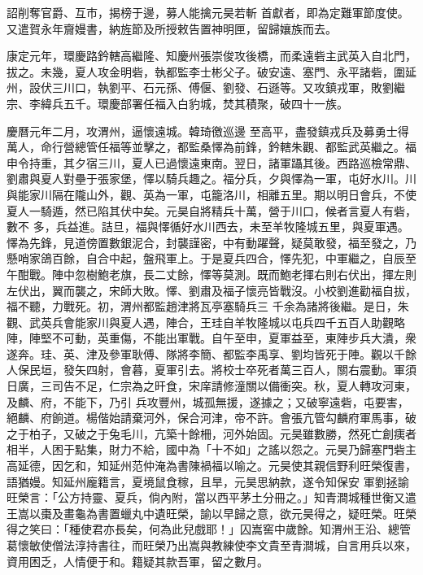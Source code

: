 \begin{pinyinscope}
 詔削奪官爵、互市，揭榜于邊，募人能擒元昊若斬
 首獻者，即為定難軍節度使。又遣賀永年齎嫚書，納旌節及所授敕告置神明匣，留歸孃族而去。



 康定元年，環慶路鈐轄高繼隆、知慶州張崇俊攻後橋，而柔遠砦主武英入自北門，拔之。未幾，夏人攻金明砦，執都監李士彬父子。破安遠、塞門、永平諸砦，圍延州，設伏三川口，執劉平、石元孫、傅偃、劉發、石遜等。又攻鎮戎軍，敗劉繼宗、李緯兵五千。環慶部署任福入白豹城，焚其積聚，破四十一族。



 慶曆元年二月，攻渭州，逼懷遠城。韓琦徼巡邊
 至高平，盡發鎮戎兵及募勇士得萬人，命行營總管任福等並擊之，都監桑懌為前鋒，鈐轄朱觀、都監武英繼之。福申令持重，其夕宿三川，夏人已過懷遠東南。翌日，諸軍躡其後。西路巡檢常鼎、劉肅與夏人對壘于張家堡，懌以騎兵趣之。福分兵，夕與懌為一軍，屯好水川。川與能家川隔在隴山外，觀、英為一軍，屯籠洛川，相離五里。期以明日會兵，不使夏人一騎遁，然已陷其伏中矣。元昊自將精兵十萬，營于川口，候者言夏人有砦，數不
 多，兵益進。詰旦，福與懌循好水川西去，未至羊牧隆城五里，與夏軍遇。懌為先鋒，見道傍置數銀泥合，封襲謹密，中有動躍聲，疑莫敢發，福至發之，乃懸哨家鴿百餘，自合中起，盤飛軍上。于是夏兵四合，懌先犯，中軍繼之，自辰至午酣戰。陣中忽樹鮑老旗，長二丈餘，懌等莫測。既而鮑老揮右則右伏出，揮左則左伏出，翼而襲之，宋師大敗。懌、劉肅及福子懷亮皆戰沒。小校劉進勸福自拔，福不聽，力戰死。初，渭州都監趙津將瓦亭塞騎兵三
 千余為諸將後繼。是日，朱觀、武英兵會能家川與夏人遇，陣合，王珪自羊牧隆城以屯兵四千五百人助觀略陣，陣堅不可動，英重傷，不能出軍戰。自午至申，夏軍益至，東陣步兵大潰，衆遂奔。珪、英、津及參軍耿傅、隊將李簡、都監李禹享、劉均皆死于陣。觀以千餘人保民垣，發矢四射，會暮，夏軍引去。將校士卒死者萬三百人，關右震動。軍須日廣，三司告不足，仁宗為之旰食，宋庠請修潼關以備衝突。秋，夏人轉攻河東，及麟、府，不能下，乃引
 兵攻豐州，城孤無援，遂據之；又破寧遠砦，屯要害，絕麟、府餉道。楊偕始請棄河外，保合河津，帝不許。會張亢管勾麟府軍馬事，破之于柏子，又破之于兔毛川，亢築十餘柵，河外始固。元昊雖數勝，然死亡創痍者相半，人困于點集，財力不給，國中為「十不如」之謠以怨之。元昊乃歸塞門砦主高延德，因乞和，知延州范仲淹為書陳禍福以喻之。元昊使其親信野利旺榮復書，語猶嫚。知延州龐籍言，夏境鼠食稼，且旱，元昊思納款，遂令知保安
 軍劉拯諭旺榮言：「公方持靈、夏兵，倘內附，當以西平茅土分冊之。」知青澗城種世衡又遣王嵩以棗及畫龜為書置蠟丸中遺旺榮，諭以早歸之意，欲元昊得之，疑旺榮。旺榮得之笑曰：「種使君亦長矣，何為此兒戲耶！」囚嵩窖中歲餘。知渭州王沿、總管葛懷敏使僧法淳持書往，而旺榮乃出嵩與教練使李文貴至青澗城，自言用兵以來，資用困乏，人情便于和。籍疑其款吾軍，留之數月。




\end{pinyinscope}
